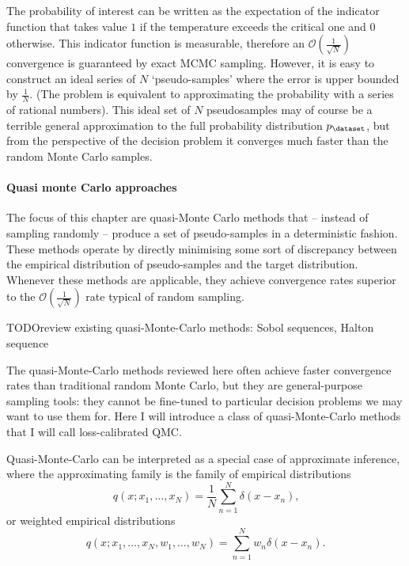The probability of interest can be written as the expectation of the indicator function that takes value $1$ if the temperature exceeds the critical one and $0$ otherwise. This indicator function is measurable, therefore an $\mathcal{O}(\frac{1}{\sqrt{N}})$ convergence is guaranteed by exact MCMC sampling.
However, it is easy to construct an ideal series of $N$ `pseudo-samples' where the error is upper bounded by $\frac{1}{N}$. (The problem is equivalent to approximating the probability with a series of rational numbers). This ideal set of $N$ pseudosamples may of course be a terrible general approximation to the full probability distribution $p_\dataset$, but from the perspective of the decision problem it converges much faster than the random Monte Carlo samples.


\paragraph{Quasi monte Carlo approaches}

 The focus of this chapter are quasi-Monte Carlo methods that -- instead of sampling randomly -- produce a set of pseudo-samples in a deterministic fashion. These methods operate by directly minimising some sort of discrepancy between the empirical distribution of pseudo-samples and the target distribution. Whenever these methods are applicable, they achieve convergence rates superior to the $\mathcal{O}(\frac{1}{\sqrt{N}})$ rate typical of random sampling.

TODO{review existing quasi-Monte-Carlo methods: Sobol sequences, Halton sequence}

The quasi-Monte-Carlo methods reviewed here often achieve faster convergence rates than traditional random Monte Carlo, but they are general-purpose sampling tools: they cannot be fine-tuned to particular decision problems we may want to use them for. Here I will introduce a class of quasi-Monte-Carlo methods that I will call loss-calibrated QMC. 

Quasi-Monte-Carlo can be interpreted as a special case of approximate inference, where the approximating family is the family of empirical distributions
\begin{equation}
	q(x ; x_1,\ldots,x_N) = \frac{1}{N} \sum_{n=1}^{N} \delta(x - x_n)\mbox{,}
\end{equation}
or weighted empirical distributions
\begin{equation}
	q(x ; x_1,\ldots,x_N,w_1,\ldots,w_N) = \sum_{n=1}^{N} w_n \delta(x - x_n)\mbox{.}
\end{equation}

